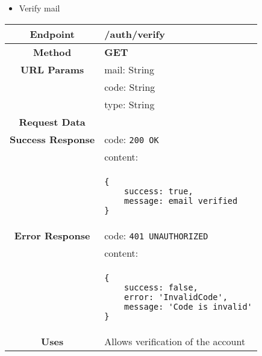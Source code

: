     \begin{itemize}
        \item Verify mail
    \end{itemize}
    \begin{adjustwidth}{1cm}{}
        \begin{longtable}{|c|l|}
            \hline
            \textbf{Endpoint} & /auth/verify \\
            \hline
            \textbf{Method} & \textbf{GET} \\
            \hline
            \textbf{URL Params} & mail: String \\
            &                     code: String \\
            &                     type: String \\
            \hline
            \textbf{Request Data} & \\
            \hline
            \textbf{Success Response} & code: \texttt{200 OK} \\
            &                           content: \\
            & \begin{minipage}[t]{0.5\textwidth}
                \begin{adjustwidth}{1.5cm}{}
                \begin{verbatim}
{
    success: true, 
    message: email verified
}
                \end{verbatim}
                \end{adjustwidth}
              \end{minipage} \\
              \hline
            \textbf{Error Response} & code: \texttt{401 UNAUTHORIZED} \\
            &                         content: \\
            & \begin{minipage}[t]{0.7\textwidth}
                \begin{adjustwidth}{1.5cm}{}
                \begin{verbatim}
{
    success: false, 
    error: 'InvalidCode',
    message: 'Code is invalid'
}
                \end{verbatim}
                \end{adjustwidth}
              \end{minipage} \\
              \hline
            \textbf{Uses} & Allows verification of the account \\

\end{longtable}
\end{adjustwidth}
